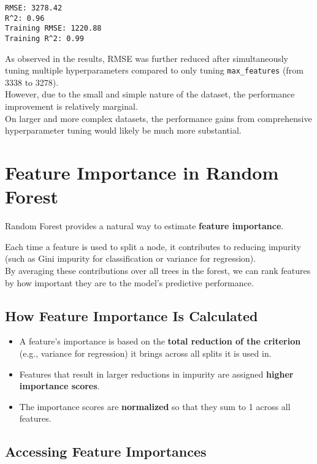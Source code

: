 \documentclass[
  letterpaper,
  DIV=11,
  numbers=noendperiod]{scrreprt}
\providecommand{\tightlist}{%
  \setlength{\itemsep}{0pt}\setlength{\parskip}{0pt}}\usepackage{longtable,booktabs,array}
\begin{document}
\begin{verbatim}
RMSE: 3278.42
R^2: 0.96
Training RMSE: 1220.88
Training R^2: 0.99
\end{verbatim}

As observed in the results, RMSE was further reduced after
simultaneously tuning multiple hyperparameters compared to only tuning
\texttt{max\_features} (from 3338 to 3278).\\
However, due to the small and simple nature of the dataset, the
performance improvement is relatively marginal.\\
On larger and more complex datasets, the performance gains from
comprehensive hyperparameter tuning would likely be much more
substantial.

\section{Feature Importance in Random
Forest}\label{feature-importance-in-random-forest}

Random Forest provides a natural way to estimate \textbf{feature
importance}.

Each time a feature is used to split a node, it contributes to reducing
impurity (such as Gini impurity for classification or variance for
regression).\\
By averaging these contributions over all trees in the forest, we can
rank features by how important they are to the model's predictive
performance.

\subsection{How Feature Importance Is
Calculated}\label{how-feature-importance-is-calculated}

\begin{itemize}
\tightlist
\item
  A feature's importance is based on the \textbf{total reduction of the
  criterion} (e.g., variance for regression) it brings across all splits
  it is used in.
\item
  Features that result in larger reductions in impurity are assigned
  \textbf{higher importance scores}.
\item
  The importance scores are \textbf{normalized} so that they sum to 1
  across all features.
\end{itemize}

\subsection{Accessing Feature
Importances}\label{accessing-feature-importances}
\end{document}
